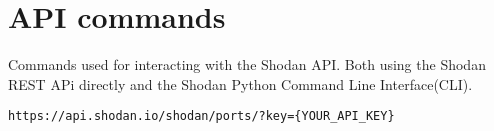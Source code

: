 \section{API commands}
Commands used for interacting with the Shodan API. Both using the Shodan REST APi directly \cite{api_ref} and the Shodan Python Command Line Interface(CLI)\cite{cli_ref}.

\begin{lstlisting}[label=lst:api_ports,caption=Ports web API call]
https://api.shodan.io/shodan/ports/?key={YOUR_API_KEY}
\end{lstlisting}